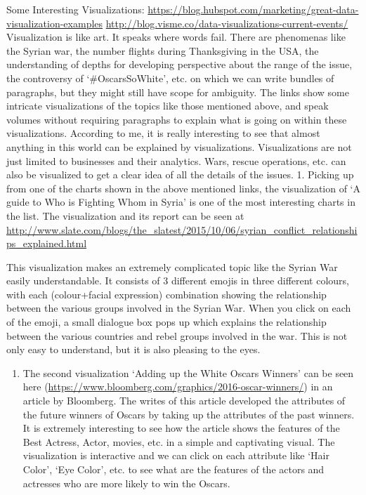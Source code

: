 \documentclass[]{book}
\providecommand{\tightlist}{%
  \setlength{\itemsep}{0pt}\setlength{\parskip}{0pt}}
\theoremstyle{definition}
\theoremstyle{definition}
\theoremstyle{definition}
\theoremstyle{remark}
\begin{document}
Some Interesting Visualizations:
\url{https://blog.hubspot.com/marketing/great-data-visualization-examples}
\url{http://blog.visme.co/data-visualizations-current-events/}
Visualization is like art. It speaks where words fail. There are
phenomenas like the Syrian war, the number flights during Thanksgiving
in the USA, the understanding of depths for developing perspective about
the range of the issue, the controversy of `\#OscarsSoWhite', etc. on
which we can write bundles of paragraphs, but they might still have
scope for ambiguity. The links show some intricate visualizations of the
topics like those mentioned above, and speak volumes without requiring
paragraphs to explain what is going on within these visualizations.
According to me, it is really interesting to see that almost anything in
this world can be explained by visualizations. Visualizations are not
just limited to businesses and their analytics. Wars, rescue operations,
etc. can also be visualized to get a clear idea of all the details of
the issues. 1. Picking up from one of the charts shown in the above
mentioned links, the visualization of `A guide to Who is Fighting Whom
in Syria' is one of the most interesting charts in the list. The
visualization and its report can be seen at
\url{http://www.slate.com/blogs/the_slatest/2015/10/06/syrian_conflict_relationships_explained.html}

This visualization makes an extremely complicated topic like the Syrian
War easily understandable. It consists of 3 different emojis in three
different colours, with each (colour+facial expression) combination
showing the relationship between the various groups involved in the
Syrian War. When you click on each of the emoji, a small dialogue box
pops up which explains the relationship between the various countries
and rebel groups involved in the war. This is not only easy to
understand, but it is also pleasing to the eyes.

\begin{enumerate}
\def\labelenumi{\arabic{enumi}.}
\setcounter{enumi}{1}
\tightlist
\item
  The second visualization `Adding up the White Oscars Winners' can be
  seen here
  (\url{https://www.bloomberg.com/graphics/2016-oscar-winners/}) in an
  article by Bloomberg. The writes of this article developed the
  attributes of the future winners of Oscars by taking up the attributes
  of the past winners. It is extremely interesting to see how the
  article shows the features of the Best Actress, Actor, movies, etc. in
  a simple and captivating visual. The visualization is interactive and
  we can click on each attribute like `Hair Color', `Eye Color', etc. to
  see what are the features of the actors and actresses who are more
  likely to win the Oscars.
\end{enumerate}
\end{document}
